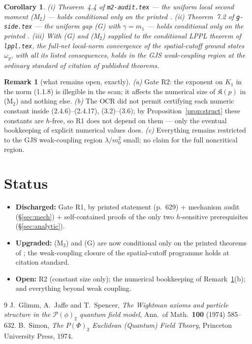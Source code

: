 \documentclass[11pt,a4paper]{article}
\theoremstyle{plain}
\newtheorem{corollary}[theorem]{Corollary}
\theoremstyle{definition}
\newtheorem{remark}[theorem]{Remark}
\begin{document}
\begin{corollary}\label{cor:consequences}
\emph{(i)} Theorem~4.4 of \texttt{m2-audit.tex} --- the uniform local second moment (M$_2$) ---
holds conditional only on the printed \cite[Thm.~1.1.8]{GJS}.
\emph{(ii)} Theorem~7.2 of \texttt{g-side.tex} --- the uniform gap (G) with $\gamma=m_1$ ---
holds conditional only on the printed \cite[Thms.~1.1.7, 1.1.8]{GJS}.
\emph{(iii)} With (G) and (M$_2$) supplied to the conditional LPPL theorem of
\texttt{lppl.tex}, the full-net local-norm convergence of the spatial-cutoff ground states
$\omega_g$, with all its listed consequences, holds in the GJS weak-coupling region at the
ordinary standard of citation of published theorems.
\end{corollary}

\begin{remark}[what remains open, exactly]\label{rem:remaining}
\emph{(a)} Gate R2: the exponent on $K_1$ in the norm (1.1.8) is illegible in the scan; it
affects the numerical size of $\mathfrak K(p)$ in (M$_2$) and nothing else.
\emph{(b)} The OCR did not permit certifying each numeric constant inside
(2.4.6)--(2.4.17), (3.2)--(3.6); by Proposition~\ref{prop:struct} these constants are $h$-free,
so R1 does not depend on them --- only the eventual bookkeeping of explicit numerical values
does.
\emph{(c)} Everything remains restricted to the GJS weak-coupling region $\lambda/m_0^2$ small;
no claim for the full noncritical region.
\end{remark}

\section{Status}

\begin{itemize}
\item \textbf{Discharged:} Gate R1, by printed statement (p.~629) + mechanism audit
      (\S\ref{sec:mech}) + self-contained proofs of the only two $h$-sensitive prerequisites
      (\S\ref{sec:analytic}).
\item \textbf{Upgraded:} (M$_2$) and (G) are now conditional only on the printed theorems of
      \cite{GJS}; the weak-coupling closure of the spatial-cutoff programme holds at citation
      standard.
\item \textbf{Open:} R2 (constant size only); the numerical bookkeeping of
      Remark~\ref{rem:remaining}(b); and everything beyond weak coupling.
\end{itemize}

\begin{thebibliography}{9}
 J.~Glimm, A.~Jaffe and T.~Spencer, \emph{The Wightman axioms and particle
structure in the $\mathscr P(\phi)_2$ quantum field model}, Ann.\ of Math.\ \textbf{100} (1974)
585--632.
 B.~Simon, \emph{The $P(\Phi)_2$ Euclidean (Quantum) Field Theory}, Princeton
University Press, 1974.
\end{thebibliography}
\end{document}
